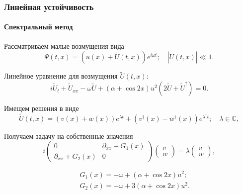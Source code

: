 \documentclass [10pt] {beamer}
\begin{document}
\begin{frame}
	\frametitle{Линейная устойчивость}
	\framesubtitle{Спектральный метод}
	
	Рассматриваем малые возмущения вида
	\begin{equation}
		\Psi(t, x) = \left( u(x) + \widetilde{U}(t, x) \right) e^{i \omega t}; \quad |\widetilde{U}(t, x)| \ll 1.
	\end{equation}
	
	Линейное уравнение для возмущения $\widetilde{U}(t, x)$:
	\begin{equation}
		i \widetilde{U}_t + \widetilde{U}_{xx} - \omega \widetilde{U} + (\alpha + \cos 2x) u^2 (2 \widetilde{U} + \widetilde{U}^\dagger) = 0.
	\end{equation}

	Имещем решения в виде
	\begin{equation}
		\widetilde{U}(t, x) = (v(x) + w(x)) e^{\lambda t} + (v^{\dagger}(x) - w^{\dagger}(x)) e^{\lambda^{\dagger} t}; \quad \lambda \in \mathbb{C},
	\end{equation}
	
	Получаем задачу на собственные значения
	\begin{equation}
		i
		\begin{pmatrix}
			0 & \partial_{xx} + G_1(x) \\
			\partial_{xx} + G_2(x) & 0
		\end{pmatrix}
		\begin{pmatrix}
			v \\
			w
		\end{pmatrix}
		= \lambda 
		\begin{pmatrix}
			v \\
			w
		\end{pmatrix},
	\label{eq:eigenvalue-problem}
	\end{equation}

	\begin{eqnarray*}
		&& G_1(x) = -\omega + (\alpha + \cos 2x) u^2; \\
		&& G_2(x) = -\omega + 3 (\alpha + \cos 2x) u^2.
	\end{eqnarray*}
\end{frame}
\end{document}

